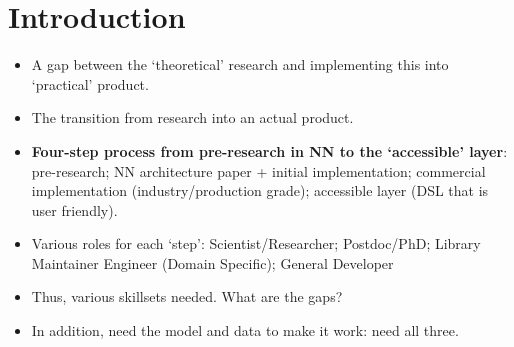 \section{Introduction}

\begin{itemize}
  \item A gap between the `theoretical' research and implementing this into `practical' product.
  \item The transition from research into an actual product.
  \item \textbf{Four-step process from pre-research in NN to the `accessible' layer}: pre-research; NN architecture paper + initial implementation; commercial implementation (industry/production grade); accessible layer (DSL that is user friendly).
  \item Various roles for each `step': Scientist/Researcher; Postdoc/PhD; Library Maintainer Engineer (Domain Specific); General Developer
  \item Thus, various skillsets needed. What are the gaps?
  \item In addition, need the model and data to make it work: need all three.
\end{itemize}